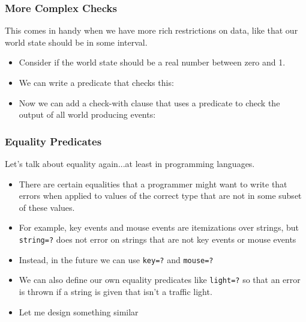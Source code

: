 \documentclass{beamer}
\begin{document}

\begin{frame}
  \frametitle{More Complex Checks}
  This comes in handy when we have more rich restrictions on data, like
  that our world state should be in some interval.
  \begin{itemize}
  \item<2-> Consider if the world state should be a real number between zero and 1.
  \item<3-> We can write a predicate that checks this: \ZeroOne
  \item<4-> Now we can add a check-with clause that uses a predicate
    to check the output of all world producing events:
    \CheckWith
  \end{itemize}
\end{frame}

\begin{frame}
  \frametitle{Equality Predicates}
  Let's talk about equality again...at least in programming languages.
  \begin{itemize}
  \item<2-> There are certain equalities that a programmer might want to write
    that errors when applied to values of the correct type that are not
    in some subset of these values.
  \item<3-> For example, key events and mouse events are itemizations over strings,
    but \texttt{string=?} does not error on strings that are not
    key events or mouse events
  \item<4-> Instead, in the future we can use \texttt{key=?}
    and \texttt{mouse=?}
  \item<5-> We can also define our own equality predicates like
    \texttt{light=?} so that an error is thrown if a string
    is given that isn't a traffic light.
  \item<6-> Let me design something similar 
  \end{itemize}
\end{frame}
\end{document}
